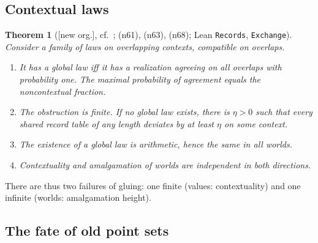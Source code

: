 \documentclass[11pt]{article}
\newtheorem{theorem}{Theorem}[section]
\theoremstyle{definition}
\theoremstyle{remark}
\newcommand{\lean}[1]{\texttt{#1}}
\newcommand{\status}[1]{\textsf{[#1]}}
\newcommand{\note}[1]{\textsf{(n#1)}}
\begin{document}
\subsection{Contextual laws}

\begin{theorem}[\status{new org.}, cf.~\cite{Abramsky11,Bell64}; \note{61}, \note{63}, \note{68}; Lean \lean{Records}, \lean{Exchange}]\label{thm:context}
Consider a family of laws on overlapping contexts, compatible on overlaps.
\begin{enumerate}
\item It has a global law iff it has a realization agreeing on all overlaps with probability one. The maximal probability of agreement equals the noncontextual fraction.
\item \emph{The obstruction is finite.} If no global law exists, there is $\eta>0$ such that every shared record table of any length deviates by at least $\eta$ on some context.
\item The existence of a global law is arithmetic, hence the same in all worlds.
\item Contextuality and amalgamation of worlds are independent in both directions.
\end{enumerate}
\end{theorem}

\noindent There are thus two failures of gluing: one finite (values: contextuality) and one infinite (worlds: amalgamation height).

\subsection{The fate of old point sets}
\end{document}
